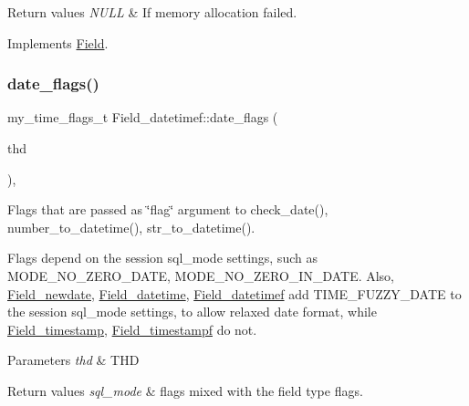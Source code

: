 \begin{DoxyRetVals}{Return values}
{\em N\+U\+LL} & If memory allocation failed. \\
\hline
\end{DoxyRetVals}


Implements \mbox{\hyperlink{classField_a01a9a9aa3a618941e839b1b8793c969d}{Field}}.

\mbox{\label{classField__datetimef_a5d243b48967c529a72ac3acb22b5a717}} 
\subsubsection{\texorpdfstring{date\+\_\+flags()}{date\_flags()}}
{\footnotesize\ttfamily my\+\_\+time\+\_\+flags\+\_\+t Field\+\_\+datetimef\+::date\+\_\+flags (\begin{DoxyParamCaption}\item[{const T\+HD $\ast$}]{thd }\end{DoxyParamCaption})\hspace{0.3cm}{\ttfamily [protected]}, {\ttfamily [virtual]}}

Flags that are passed as \char`\"{}flag\char`\"{} argument to check\+\_\+date(), number\+\_\+to\+\_\+datetime(), str\+\_\+to\+\_\+datetime().

Flags depend on the session sql\+\_\+mode settings, such as M\+O\+D\+E\+\_\+\+N\+O\+\_\+\+Z\+E\+R\+O\+\_\+\+D\+A\+TE, M\+O\+D\+E\+\_\+\+N\+O\+\_\+\+Z\+E\+R\+O\+\_\+\+I\+N\+\_\+\+D\+A\+TE. Also, \mbox{\hyperlink{classField__newdate}{Field\+\_\+newdate}}, \mbox{\hyperlink{classField__datetime}{Field\+\_\+datetime}}, \mbox{\hyperlink{classField__datetimef}{Field\+\_\+datetimef}} add T\+I\+M\+E\+\_\+\+F\+U\+Z\+Z\+Y\+\_\+\+D\+A\+TE to the session sql\+\_\+mode settings, to allow relaxed date format, while \mbox{\hyperlink{classField__timestamp}{Field\+\_\+timestamp}}, \mbox{\hyperlink{classField__timestampf}{Field\+\_\+timestampf}} do not.


\begin{DoxyParams}{Parameters}
{\em thd} & T\+HD \\
\hline
\end{DoxyParams}

\begin{DoxyRetVals}{Return values}
{\em sql\+\_\+mode} & flags mixed with the field type flags. \\
\hline
\end{DoxyRetVals}


